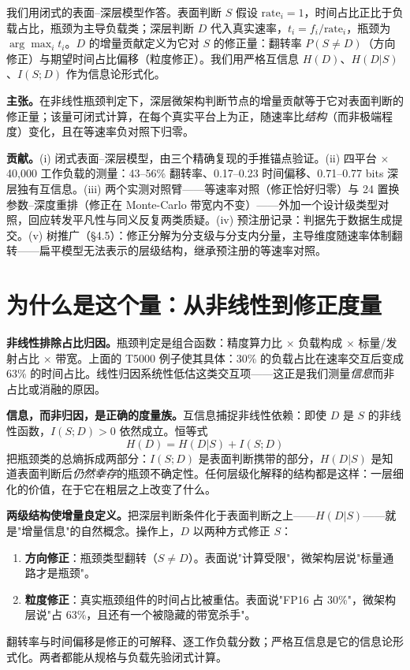 \documentclass[12pt]{ctexart}
\begin{document}
我们用闭式的表面--深层模型作答。表面判断 $S$ 假设 $\text{rate}_i = 1$，时间占比正比于负载占比，瓶颈为主导负载类；深层判断 $D$ 代入真实速率，$t_i = f_i/\text{rate}_i$，瓶颈为 $\arg\max_i t_i$。$D$ 的增量贡献定义为它对 $S$ 的修正量：翻转率 $P(S \neq D)$（方向修正）与期望时间占比偏移（粒度修正）。我们用严格互信息 $H(D)$、$H(D|S)$、$I(S;D)$ 作为信息论形式化。

\textbf{主张。}在非线性瓶颈判定下，深层微架构判断节点的增量贡献等于它对表面判断的修正量；该量可闭式计算，在每个真实平台上为正，随速率比\emph{结构}（而非极端程度）变化，且在等速率负对照下归零。

\textbf{贡献。}(i) 闭式表面--深层模型，由三个精确复现的手推锚点验证。(ii) 四平台 $\times$ 40{,}000 工作负载的测量：43--56\% 翻转率、0.17--0.23 时间偏移、0.71--0.77 bits 深层独有互信息。(iii) 两个实测对照臂——等速率对照（修正恰好归零）与 24 置换参数--深度重排（修正在 Monte-Carlo 带宽内不变）——外加一个设计级类型对照，回应转发平凡性与同义反复两类质疑。(iv) 预注册记录：判据先于数据生成提交。(v) 树推广（§4.5）：修正分解为分支级与分支内分量，主导维度随速率体制翻转——扁平模型无法表示的层级结构，继承预注册的等速率对照。

\section{为什么是这个量：从非线性到修正度量}\label{why}

\textbf{非线性排除占比归因。}瓶颈判定是组合函数：精度算力比 $\times$ 负载构成 $\times$ 标量/发射占比 $\times$ 带宽。上面的 T5000 例子使其具体：30\% 的负载占比在速率交互后变成 63\% 的时间占比。线性归因系统性低估这类交互项——这正是我们测量\emph{信息}而非占比或消融的原因。

\textbf{信息，而非归因，是正确的度量族。}互信息捕捉非线性依赖：即使 $D$ 是 $S$ 的非线性函数，$I(S;D) > 0$ 依然成立。恒等式
\[
H(D) = H(D|S) + I(S;D)
\]
把瓶颈类的总熵拆成两部分：$I(S;D)$ 是表面判断携带的部分，$H(D|S)$ 是知道表面判断后\emph{仍然幸存}的瓶颈不确定性。任何层级化解释的结构都是这样：一层细化的价值，在于它在粗层之上改变了什么。

\textbf{两级结构使增量良定义。}把深层判断条件化于表面判断之上——$H(D|S)$——就是"增量信息"的自然概念。操作上，$D$ 以两种方式修正 $S$：
\begin{enumerate}
  \item \textbf{方向修正}：瓶颈类型翻转（$S \neq D$）。表面说"计算受限"，微架构层说"标量通路才是瓶颈"。
  \item \textbf{粒度修正}：真实瓶颈组件的时间占比被重估。表面说"FP16 占 30\%"，微架构层说"占 63\%，且还有一个被隐藏的带宽杀手"。
\end{enumerate}
翻转率与时间偏移是修正的可解释、逐工作负载分数；严格互信息是它的信息论形式化。两者都能从规格与负载先验闭式计算。
\end{document}
